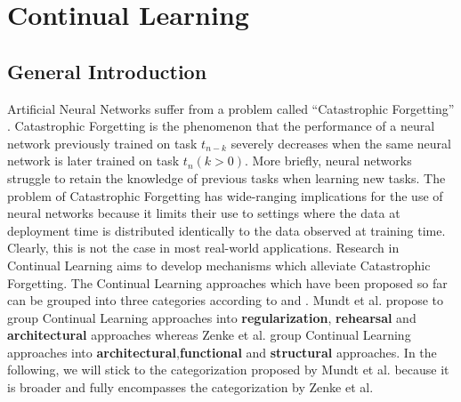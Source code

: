 \section{Continual Learning}
\label{sec:Related_work:Continual_Learning}
\subsection{General Introduction}
Artificial Neural Networks suffer from a problem called \enquote{Catastrophic Forgetting} \cite{mccloskey1989catastrophic}.
Catastrophic Forgetting is the phenomenon that the performance of a neural network previously trained on task $t_{n-k}$
severely decreases when the same neural network is later trained on task $t_n (k>0)$. More briefly, neural networks struggle
to retain the knowledge of previous tasks when learning new tasks. The problem of Catastrophic Forgetting has wide-ranging
implications for the use of neural networks because it limits their use to settings where the data at deployment time is
distributed identically to the data observed at training time. Clearly, this is not the case in most real-world applications.
Research in Continual Learning aims to develop mechanisms which alleviate Catastrophic Forgetting. The Continual Learning approaches
which have been proposed so far can be grouped into three categories according to \cite{mundt2020wholistic} and
\cite{zenke2017continual}. Mundt et al. \cite{mundt2020wholistic} propose to group Continual Learning approaches into
\textbf{regularization}, \textbf{rehearsal} and \textbf{architectural} approaches whereas Zenke et al. \cite{zenke2017continual}
group Continual Learning approaches into \textbf{architectural},\textbf{functional} and \textbf{structural} approaches. In the
following, we will stick to the categorization proposed by Mundt et al. because it is broader and fully encompasses the
categorization by Zenke et al.
